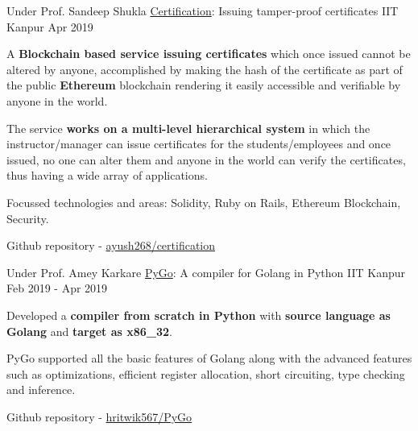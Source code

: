 \begin{cventries}

  \cventry
    {Under Prof. Sandeep Shukla} %
    {\href{https://github.com/ayush268/certification}{Certification}: Issuing tamper-proof certificates} %
    {IIT Kanpur} %
    {Apr 2019} %
    {
      \begin{cvitems} %
        \item {A \textbf{Blockchain based service issuing certificates} which once issued cannot be altered by anyone, accomplished by making the hash of the certificate as part of the public \textbf{Ethereum} blockchain rendering it easily accessible and verifiable by anyone in the world.}
        \item {The service \textbf{works on a multi-level hierarchical system} in which the instructor/manager can issue certificates for the students/employees and once issued, no one can alter them and anyone in the world can verify the certificates, thus having a wide array of applications.}
        \item {Focussed technologies and areas: Solidity, Ruby on Rails, Ethereum Blockchain, Security.}
        \item {Github repository - \href{https://github.com/ayush268/certification}{ayush268/certification}}
      \end{cvitems}
    }



  \cventry
    {Under Prof. Amey Karkare} %
    {\href{https://github.com/hritwik567/PyGo}{PyGo}: A compiler for Golang in Python} %
    {IIT Kanpur} %
    {Feb 2019 - Apr 2019} %
    {
      \begin{cvitems} %
      \item {Developed a \textbf{compiler from scratch in Python} with \textbf{source language as Golang} and \textbf{target as x86\_32}.}
      \item {PyGo supported all the basic features of Golang along with the advanced features such as optimizations, efficient register allocation, short circuiting, type checking and inference.}
      \item {Github repository - \href{https://github.com/hritwik567/PyGo}{hritwik567/PyGo}}
      \end{cvitems}
    }


\end{cventries}
